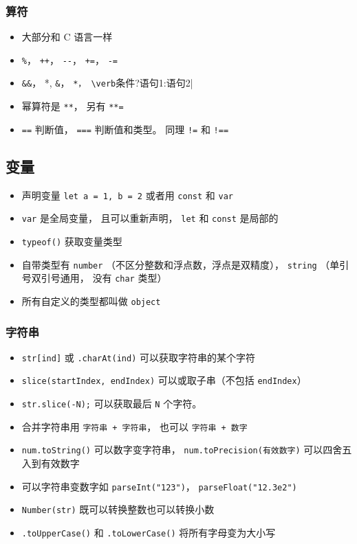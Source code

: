\subsubsection{算符}
\begin{itemize}
\item 大部分和 C 语言一样
\item \verb|%|， \verb|++|， \verb|--|， \verb|+=|， \verb|-=|
\item \verb|&&|， \verb*||*, \verb|&|， \verb*|*， \verb|条件?语句1:语句2|
\item 幂算符是 \verb|**|， 另有 \verb|**=|
\item \verb|==| 判断值， \verb|===| 判断值和类型。 同理 \verb|!=| 和 \verb|!==|
\end{itemize}

\subsection{变量}
\begin{itemize}
\item 声明变量 \verb|let a = 1, b = 2| 或者用 \verb|const| 和 \verb|var|
\item \verb|var| 是全局变量， 且可以重新声明， \verb|let| 和 \verb|const| 是局部的
\item \verb|typeof()| 获取变量类型
\item 自带类型有 \verb|number| （不区分整数和浮点数，浮点是双精度）， \verb|string| （单引号双引号通用， 没有 \verb`char` 类型）
\item 所有自定义的类型都叫做 \verb|object|
\end{itemize}

\subsubsection{字符串}
\begin{itemize}
\item \verb|str[ind]| 或 \verb|.charAt(ind)| 可以获取字符串的某个字符
\item \verb`slice(startIndex, endIndex)` 可以或取子串（不包括 \verb`endIndex`）
\item \verb`str.slice(-N);` 可以获取最后 \verb`N` 个字符。
\item 合并字符串用 \verb|字符串 + 字符串|， 也可以 \verb|字符串 + 数字|
\item \verb|num.toString()| 可以数字变字符串， \verb|num.toPrecision(有效数字)| 可以四舍五入到有效数字
\item 可以字符串变数字如 \verb|parseInt("123")|， \verb|parseFloat("12.3e2")|
\item \verb|Number(str)| 既可以转换整数也可以转换小数
\item \verb|.toUpperCase()| 和 \verb|.toLowerCase()| 将所有字母变为大小写
\end{itemize}


